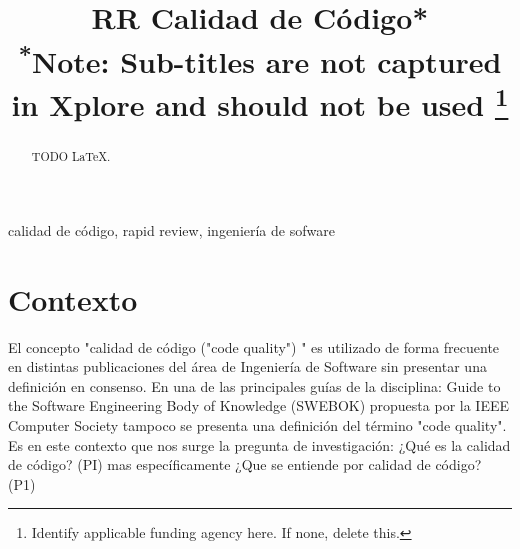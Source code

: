 \documentclass[conference]{IEEEtran}
\begin{document}
\title{RR Calidad de Código*\\
{\footnotesize \textsuperscript{*}Note: Sub-titles are not captured in Xplore and
should not be used}
\thanks{Identify applicable funding agency here. If none, delete this.}
}

\author{
\and
{}


}

\maketitle

\begin{abstract}
TODO \LaTeX.
\end{abstract}

\begin{IEEEkeywords}
calidad de código, rapid review, ingeniería de sofware
\end{IEEEkeywords}

\section{Contexto}



 El concepto "calidad de código ("code quality") " es utilizado de forma frecuente en distintas publicaciones del área de Ingeniería de Software \cite{stamelos2002code,spinellis2006code,butler2010exploring,baggen2012standardized, raychev2021learning,yang2021design} sin presentar una definición en consenso.   En una de las principales guías de la disciplina:  Guide to the Software Engineering Body of Knowledge (SWEBOK) \cite{bourque1999guide} propuesta por la IEEE Computer Society  tampoco  se presenta una definición del término "code quality".
  Es en este contexto que nos surge la pregunta de investigación:  ¿Qué es la calidad de código?  (PI) mas específicamente ¿Que se entiende por calidad de código? (P1)
\end{document}
